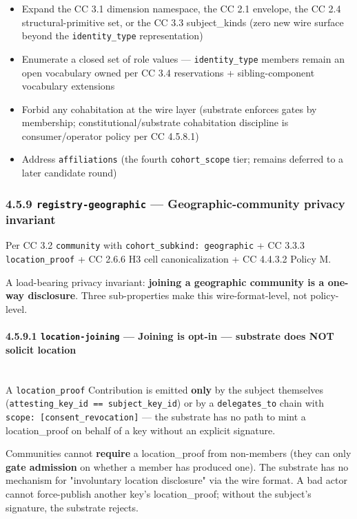\documentclass[11pt]{article}
\begin{document}
\begin{itemize}\setlength\itemsep{0pt}
\item Expand the CC 3.1 dimension namespace, the CC 2.1 envelope, the CC 2.4 structural-primitive set, or the CC 3.3 subject\_kinds (zero new wire surface beyond the \texttt{identity\_type} representation)
\item Enumerate a closed set of role values — \texttt{identity\_type} members remain an open vocabulary owned per CC 3.4 reservations + sibling-component vocabulary extensions
\item Forbid any cohabitation at the wire layer (substrate enforces gates by membership; constitutional/substrate cohabitation discipline is consumer/operator policy per CC 4.5.8.1)
\item Address \texttt{affiliations} (the fourth \texttt{cohort\_scope} tier; remains deferred to a later candidate round)
\end{itemize}


\subsubsection*{4.5.9 \texttt{registry-geographic} — Geographic-community privacy invariant}


Per CC 3.2 \texttt{community} with \texttt{cohort\_subkind: geographic} + CC 3.3.3 \texttt{location\_proof} + CC 2.6.6 H3 cell canonicalization + CC 4.4.3.2 Policy M.


A load-bearing privacy invariant: \textbf{joining a geographic community is a one-way disclosure}. Three sub-properties make this wire-format-level, not policy-level.


\paragraph{4.5.9.1 \texttt{location-joining} — Joining is opt-in — substrate does NOT solicit location}\mbox{}\\


A \texttt{location\_proof} Contribution is emitted \textbf{only} by the subject themselves (\texttt{attesting\_key\_id == subject\_key\_id}) or by a \texttt{delegates\_to} chain with \texttt{scope: [consent\_revocation]} — the substrate has no path to mint a location\_proof on behalf of a key without an explicit signature.


Communities cannot \textbf{require} a location\_proof from non-members (they can only \textbf{gate admission} on whether a member has produced one). The substrate has no mechanism for "involuntary location disclosure" via the wire format. A bad actor cannot force-publish another key's location\_proof; without the subject's signature, the substrate rejects.
\end{document}
